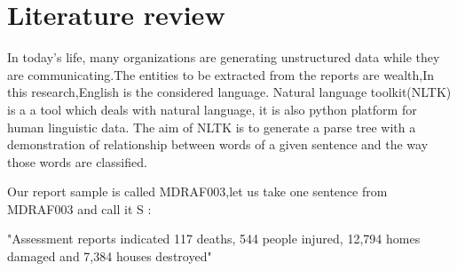 \chapter{Literature review}

In today's life, many organizations are generating unstructured data while they are communicating.The entities to be extracted from the reports are wealth,In this research,English is the considered language. 
Natural language toolkit(NLTK) is a a tool which deals with natural language, it is also  python platform for human linguistic data. 
The aim of NLTK is to generate a parse tree with a demonstration of relationship between words of a given sentence and the way those words are  classified.

Our report  sample is called MDRAF003,let us take one sentence from MDRAF003 and call it S
:
 
"Assessment reports indicated 117 deaths, 544 people injured, 12,794 homes damaged and 7,384 houses destroyed"

